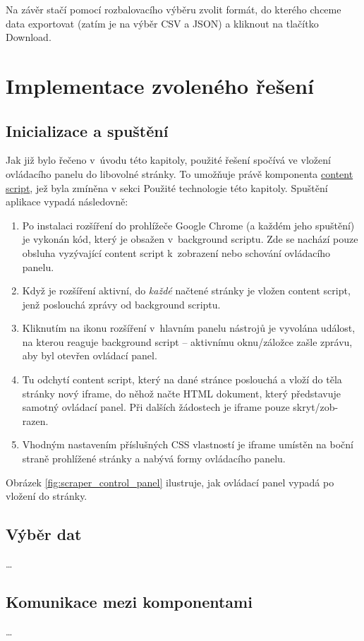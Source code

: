 \documentclass[thesis=B,czech]{FITthesis}[2012/06/26]
\begin{document}
Na závěr stačí pomocí rozbalovacího výběru zvolit formát, do kterého chceme data exportovat (zatím je na výběr CSV a JSON) a kliknout na tlačítko \textsf{Download}.

\newpage
\section{Implementace zvoleného řešení}
\subsection{Inicializace a spuštění}
Jak již bylo řečeno v~úvodu této kapitoly, použité řešení spočívá ve vložení ovládacího panelu do libovolné stránky. To umožňuje právě komponenta \hyperref[def:content_script]{content script}, jež byla zmíněna v sekci Použité technologie této kapitoly. Spuštění aplikace vypadá následovně:
\begin{enumerate}
	\item Po instalaci rozšíření do prohlížeče Google Chrome (a každém jeho spuštění) je vykonán kód, který je obsažen v~background scriptu. Zde se nachází pouze obsluha vyzývající content script k~zobrazení nebo schování ovládacího panelu.
	\item Když je rozšíření aktivní, do \emph{každé} načtené stránky je vložen content script, jenž poslouchá zprávy od background scriptu.
	\item Kliknutím na ikonu rozšíření v~hlavním panelu nástrojů je vyvolána událost, na kterou reaguje background script -- aktivnímu oknu/záložce zašle zprávu, aby byl otevřen ovládací panel. 
	\item Tu odchytí content script, který na dané stránce poslouchá a vloží do těla stránky nový iframe, do něhož načte HTML dokument, který představuje samotný ovládací panel. Při dalších žádostech je iframe pouze skryt/zob-razen.
	\item Vhodným nastavením příslušných CSS vlastností je iframe umístěn na boční straně prohlížené stránky a nabývá formy ovládacího panelu. 
\end{enumerate}
Obrázek \ref{fig:scraper_control_panel} ilustruje, jak ovládací panel vypadá po vložení do stránky.

\subsection{Výběr dat}
\dots

\subsection{Komunikace mezi komponentami}
\dots
\end{document}
